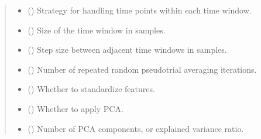 \documentclass[letterpaper,10pt,english]{sphinxhowto}
\begin{document}
\begin{fulllineitems}
\begin{quote}
\begin{description}
\begin{itemize}
\item {} 
\sphinxAtStartPar
{} (\sphinxstyleliteralemphasis{\sphinxupquote{, }}\sphinxstyleliteralemphasis{\sphinxupquote{, }}) \textendash{} Strategy for handling time points within each time window.

\item {} 
\sphinxAtStartPar
{} (\sphinxstyleliteralemphasis{\sphinxupquote{, }}) \textendash{} Size of the time window in samples.

\item {} 
\sphinxAtStartPar
{} (\sphinxstyleliteralemphasis{\sphinxupquote{, }}) \textendash{} Step size between adjacent time windows in samples.

\item {} 
\sphinxAtStartPar
{} (\sphinxstyleliteralemphasis{\sphinxupquote{, }}) \textendash{} Number of repeated random pseudo\sphinxhyphen{}trial averaging iterations.

\item {} 
\sphinxAtStartPar
{} (\sphinxstyleliteralemphasis{\sphinxupquote{, }}) \textendash{} Whether to standardize features.

\item {} 
\sphinxAtStartPar
{} (\sphinxstyleliteralemphasis{\sphinxupquote{, }}) \textendash{} Whether to apply PCA.

\item {} 
\sphinxAtStartPar
{} (\sphinxstyleliteralemphasis{\sphinxupquote{, }}) \textendash{} Number of PCA components, or explained variance ratio.


\end{itemize}
\end{description}
\end{quote}
\end{fulllineitems}
\end{document}
